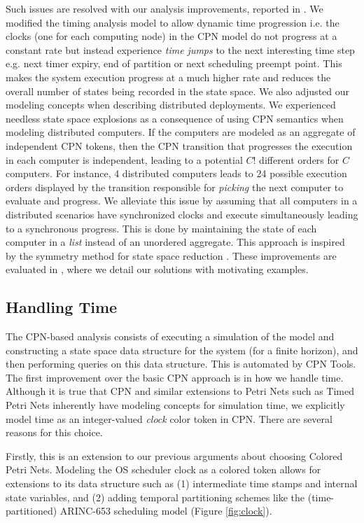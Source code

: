 Such issues are resolved with our analysis improvements, reported in \cite{SEUS}. We modified the timing analysis model to allow dynamic time progression i.e. the clocks (one for each computing node) in the CPN model do not progress at a constant rate but instead experience \emph{time jumps} to the next interesting time step e.g. next timer expiry, end of partition or next scheduling preempt point. This makes the system execution progress at a much higher rate and reduces the overall number of states being recorded in the state space. We also adjusted our modeling concepts when describing distributed deployments. We experienced needless state space explosions as a consequence of using CPN semantics when modeling distributed computers. If the computers are modeled as an aggregate of independent CPN tokens, then the CPN transition that progresses the execution in each computer is independent, leading to a potential $C!$ different orders for $C$ computers. For instance, 4 distributed computers leads to 24 possible execution orders displayed by the transition responsible for \emph{picking} the next computer to evaluate and progress. We alleviate this issue by assuming that all computers in a distributed scenarios have synchronized clocks and execute simultaneously leading to a synchronous progress. This is done by maintaining the state of each computer in a \emph{list} instead of an unordered aggregate. This approach is inspired by the symmetry method for state space reduction \cite{Kristensen2000}. These improvements are evaluated in \cite{SEUS}, where we detail our solutions with motivating examples. 

\subsection{Handling Time}
\label{handling_time}

The CPN-based analysis consists of executing a simulation of the model and constructing a state space data structure for the system (for a finite horizon), and then performing queries on this data structure. This is automated by CPN Tools. The first improvement over the basic CPN approach is in how we handle time. Although it is true that CPN and similar extensions to Petri Nets such as Timed Petri Nets inherently have modeling concepts for simulation time, we explicitly model time as an integer-valued \emph{clock} color token in CPN. There are several reasons for this choice. 

Firstly, this is an extension to our previous arguments about choosing Colored Petri Nets. Modeling the OS scheduler clock as a colored token allows for extensions to its data structure such as (1) intermediate time stamps and internal state variables, and (2) adding temporal partitioning schemes like the (time-partitioned) ARINC-653 \cite{ARINC-653} scheduling model (Figure \ref{fig:clock}). 

